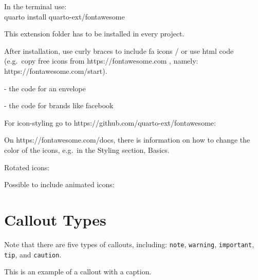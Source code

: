 \documentclass[
  letterpaper,
]{scrbook}
\begin{document}
In the terminal use:\\
quarto install quarto-ext/fontawesome

This extension folder has to be installed in every project.

After installation, use curly braces to include fa icons / or use html
code (e.g.~copy free icons from https://fontawesome.com , namely:
https://fontawesome.com/start).

 - the code for an envelope

 - the code for brands like facebook

For icon-styling go to https://github.com/quarto-ext/fontawesome:


On https://fontawesome.com/docs, there is information on how to change
the color of the icons, e.g.~in the Styling section, Basics.

{ }

Rotated icons:

Possible to include animated icons:

\hypertarget{callout-types}{%
\section{Callout Types}\label{callout-types}}

\begin{tcolorbox}[enhanced jigsaw, toptitle=1mm, arc=.35mm, toprule=.15mm, colback=white, bottomrule=.15mm, title=\textcolor{quarto-callout-note-color}{\faInfo}\hspace{0.5em}{Note}, breakable, rightrule=.15mm, opacitybacktitle=0.6, left=2mm, coltitle=black, leftrule=.75mm, opacityback=0, colbacktitle=quarto-callout-note-color!10!white, bottomtitle=1mm, titlerule=0mm, colframe=quarto-callout-note-color-frame]

Note that there are five types of callouts, including: \texttt{note},
\texttt{warning}, \texttt{important}, \texttt{tip}, and
\texttt{caution}.

\end{tcolorbox}

\begin{tcolorbox}[enhanced jigsaw, toptitle=1mm, arc=.35mm, toprule=.15mm, colback=white, bottomrule=.15mm, title=\textcolor{quarto-callout-tip-color}{\faLightbulb}\hspace{0.5em}{Tip With Caption / Tipp mit Titel}, breakable, rightrule=.15mm, opacitybacktitle=0.6, left=2mm, coltitle=black, leftrule=.75mm, opacityback=0, colbacktitle=quarto-callout-tip-color!10!white, bottomtitle=1mm, titlerule=0mm, colframe=quarto-callout-tip-color-frame]

This is an example of a callout with a caption.

\end{tcolorbox}
\end{document}
